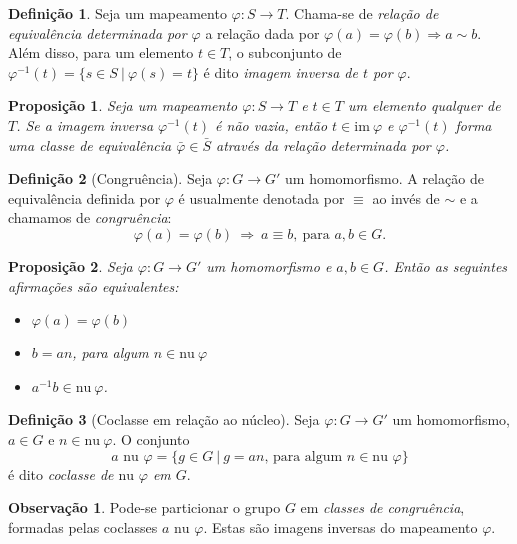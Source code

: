 \documentclass[a4paper,12pt]{report}
\theoremstyle{plain}
\newtheorem{proposicao}{Proposição}[section]
\theoremstyle{definition}
\newtheorem{definicao}{Definição}[section]
\newtheorem{observacao}{Observação}[section]
\begin{document}
\begin{definicao}
	Seja um mapeamento \(\varphi: S \longrightarrow T\).
	Chama-se de \emph{relação de equivalência determinada por \(\varphi\)} a
	relação dada por \(\varphi(a) = \varphi(b) \Rightarrow a \sim b\). Além
	disso, para um elemento \(t\in T\), o subconjunto de
	\(\varphi^{-1}(t) = \{s \in S\ | \ \varphi(s) = t\}\) é dito
	\emph{imagem inversa de \(t\) por \(\varphi\)}.
\end{definicao}

\begin{proposicao}
	Seja um mapeamento \(\varphi: S \longrightarrow T\)
	e \(t \in T\) um elemento qualquer de \(T\). Se a imagem inversa
	\(\varphi^{-1}(t)\) é não vazia, então \(t \in \text{im}\ \varphi\) e
	\(\varphi^{-1}(t)\) forma uma classe de equivalência
	\(\bar{\varphi}\in \bar{S}\) através da relação determinada por
	\(\varphi\).	
\end{proposicao}

\begin{definicao}[Congruência]
	Seja \(\varphi: G\longrightarrow G'\) um
	homomorfismo. A relação de equivalência definida por \(\varphi\) é
	usualmente denotada por \(\equiv\) ao invés de \(\sim\) e a chamamos de
	\emph{congruência}:
	\[\varphi(a) = \varphi(b) \ \Rightarrow \ a \equiv b, \ \text{para }a,b \in G.\]	
\end{definicao}

\begin{proposicao}
	Seja \(\varphi: G\longrightarrow G'\) um
	homomorfismo e \(a,b \in G\). Então as seguintes afirmações são
	equivalentes:
	\begin{itemize}
		\item
		\(\varphi(a) = \varphi(b)\)
		\item
		\(b = an\), para algum \(n\in \text{nu} \ \varphi\)
		\item
		\(a^{-1}b \in \text{nu} \ \varphi\).
	\end{itemize}	
\end{proposicao}

\begin{definicao}[Coclasse em relação ao núcleo]
	Seja \(\varphi: G\longrightarrow G'\) um
	homomorfismo, \(a \in G\) e \(n\in\text{nu}\ \varphi\). O conjunto
	\[a\text{ nu }\varphi = \{g\in G \ | \ g = an \text{, para algum } n\in\text{nu }\varphi\}\] é dito \emph{coclasse de \(\text{nu }\varphi\) em \(G\)}.	
\end{definicao}

\begin{observacao}
	Pode-se particionar o grupo \(G\) em \emph{classes de congruência},
	formadas pelas coclasses \(a\text{ nu }\varphi\). Estas são imagens
	inversas do mapeamento \(\varphi\).
\end{observacao}
\end{document}
